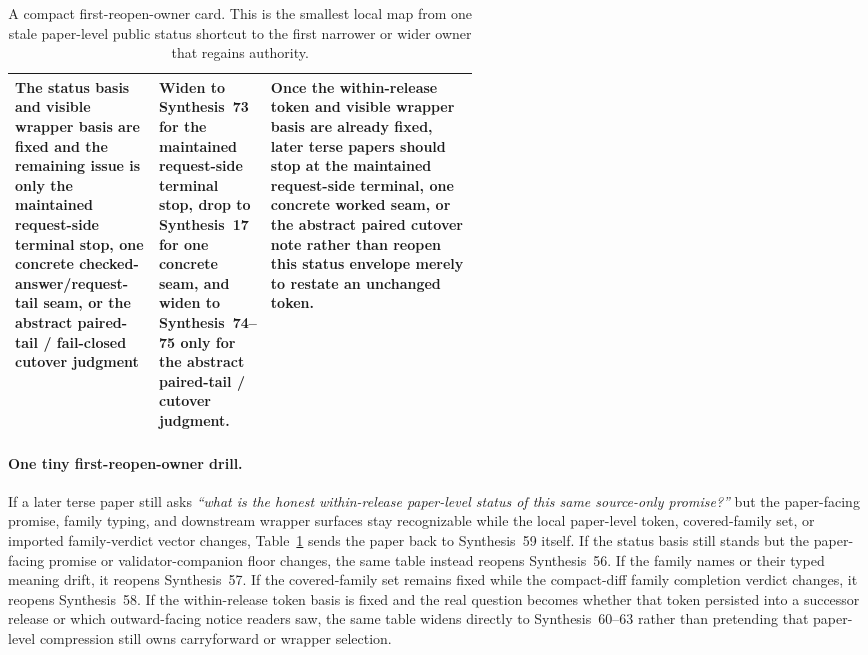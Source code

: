 \documentclass[11pt]{article}
\begin{document}
\begin{table}[t]
\begin{tabularx}{\linewidth}{@{}p{0.31\linewidth}p{0.23\linewidth}X@{}}
The status basis and visible wrapper basis are fixed and the remaining issue is only the maintained request-side terminal stop, one concrete checked-answer/request-tail seam, or the abstract paired-tail / fail-closed cutover judgment & Widen to Synthesis~73 for the maintained request-side terminal stop, drop to Synthesis~17 for one concrete seam, and widen to Synthesis~74--75 only for the abstract paired-tail / cutover judgment. & Once the within-release token and visible wrapper basis are already fixed, later terse papers should stop at the maintained request-side terminal, one concrete worked seam, or the abstract paired cutover note rather than reopen this status envelope merely to restate an unchanged token. \\
\bottomrule
\end{tabularx}
\caption{A compact first-reopen-owner card. This is the smallest local map from one stale paper-level public status shortcut to the first narrower or wider owner that regains authority.}
\label{tab:first-reopen-owner-card-public-request-status}
\end{table}

\paragraph{One tiny first-reopen-owner drill.}
If a later terse paper still asks \emph{``what is the honest within-release paper-level status of this same source-only promise?''} but the paper-facing promise, family typing, and downstream wrapper surfaces stay recognizable while the local paper-level token, covered-family set, or imported family-verdict vector changes, Table~\ref{tab:first-reopen-owner-card-public-request-status} sends the paper back to Synthesis~59 itself. If the status basis still stands but the paper-facing promise or validator-companion floor changes, the same table instead reopens Synthesis~56. If the family names or their typed meaning drift, it reopens Synthesis~57. If the covered-family set remains fixed while the compact-diff family completion verdict changes, it reopens Synthesis~58. If the within-release token basis is fixed and the real question becomes whether that token persisted into a successor release or which outward-facing notice readers saw, the same table widens directly to Synthesis~60--63 rather than pretending that paper-level compression still owns carryforward or wrapper selection.\cite{series:workedexample,series:publicrequestcontracts,series:requestableevidenceclasses,series:requestfulfillmentcertificates,series:publicrequestcarryforward,series:publicrequestnotices,series:publicrequestnoticenormalforms,series:publicrequestnoticeselections,series:requestsideterminalcitationnormalform,series:pairedterminalcitationdiscipline,series:pairedterminalcutoverrules}
\end{document}

